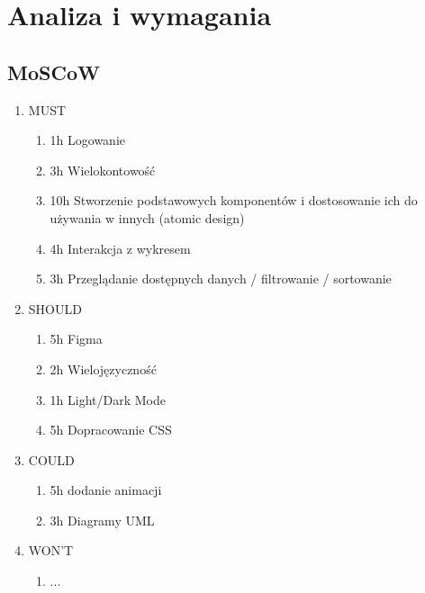 \documentclass[a4paper,11pt]{article}
\begin{document}
\maketitle

\section{Analiza i wymagania}
\subsection{MoSCoW}


\begin{enumerate}
    \item MUST
    \begin{enumerate}
        \item 1h Logowanie
        \item 3h Wielokontowość
        \item 10h Stworzenie podstawowych komponentów i dostosowanie ich do używania w innych (atomic design)
        \item 4h Interakcja z wykresem
        \item 3h Przeglądanie dostępnych danych / filtrowanie / sortowanie
    \end{enumerate}
    \item SHOULD
    \begin{enumerate}
        \item 5h Figma
        \item 2h Wielojęzyczność
        \item 1h Light/Dark Mode
        \item 5h Dopracowanie CSS
    \end{enumerate}
    \item COULD
    \begin{enumerate}
        \item 5h dodanie animacji
        \item 3h Diagramy UML  
    \end{enumerate}
    \item WON'T
    \begin{enumerate}
        \item ...
        
    \end{enumerate}
\end{enumerate}
\end{document}
